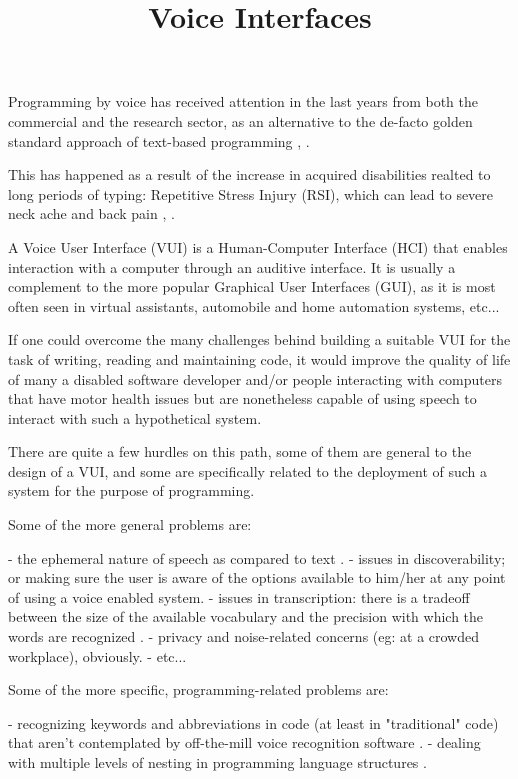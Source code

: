 \title{Voice Interfaces}

Programming by voice has received attention in the last years from both the commercial and the research sector, as an alternative to the de-facto golden standard approach of text-based programming \cite{lagergren2021programming}, 
\cite{arnold2000programming}.

This has happened as a result of the increase in acquired disabilities realted to long periods of typing: Repetitive Stress Injury (RSI), which can lead to severe neck ache and back pain \cite{lagergren2021programming}, \cite{arnold2000programming}.

A Voice User Interface (VUI) is a Human-Computer Interface (HCI) that enables interaction with a computer through an auditive interface. It is usually a complement to the more popular Graphical User Interfaces (GUI), as it is most often seen in virtual assistants, automobile and home automation systems, etc...

If one could overcome the many challenges behind building a suitable VUI for the task of writing, reading and maintaining code, it would improve the quality of life of many a disabled software developer and/or people interacting with computers that have motor health issues but are nonetheless capable of using speech to interact with such a hypothetical system.

There are quite a few hurdles on this path, some of them are general to the design of a VUI, and some are specifically related to the deployment of such a system for the purpose of programming.

Some of the more general problems are:


- the ephemeral nature of speech as compared to text \cite{farinazzo2010empirical}.
- issues in discoverability; or making sure the user is aware of the options available to him/her at any point of using a voice enabled system.
- issues in transcription: there is a tradeoff between the size of the available vocabulary and the precision with which the words are recognized \cite{farinazzo2010empirical}.
- privacy and noise-related concerns (eg: at a crowded workplace), obviously.
- etc...

Some of the more specific, programming-related problems are:

- recognizing keywords and abbreviations in code (at least in "traditional" code) that aren't contemplated by off-the-mill voice recognition software \cite{arnold2000programming}.
- dealing with multiple levels of nesting in programming language structures \cite{arnold2000programming}.

